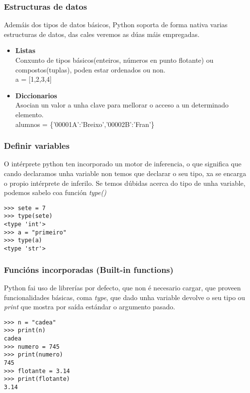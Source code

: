 \begin{frame}
  \frametitle{Estructuras de datos}
  Ademáis dos tipos de datos básicos, Python soporta de forma nativa varias
  estructuras de datos, das cales veremos as dúas máis empregadas.
  \begin{itemize}
  \item \textbf{Listas}\\
    Conxunto de tipos básicos(enteiros, números en punto flotante) ou
    compostos(tuplas), poden estar ordenados ou non.\\
    a = [1,2,3,4]
  \item \textbf{Diccionarios}\\
    Asocian un valor a unha clave para mellorar o acceso a un determinado
    elemento.\\
    alumnos = \{'00001A':'Breixo','00002B':'Fran'\}
  \end{itemize}
\end{frame}

\begin{frame}[fragile]
  \frametitle{Definir variables}
  O intérprete python ten incorporado un motor de inferencia, o que significa
  que cando declaramos unha variable non temos que declarar o seu tipo, xa se
  encarga o propio intérprete de inferilo. Se temos dúbidas acerca do tipo de unha
  variable, podemos sabelo coa función \emph{type()}
  \small
\begin{verbatim}
>>> sete = 7
>>> type(sete)
<type 'int'>
>>> a = "primeiro"
>>> type(a)
<type 'str'>
\end{verbatim}
  \normalsize  
\end{frame}

\begin{frame}[fragile]
  \frametitle{Funcións incorporadas (Built-in functions)}
  Python fai uso de librerías por defecto, que non é necesario cargar, que
  proveen funcionalidades básicas, coma \emph{type}, que dado unha variable
  devolve o seu tipo ou \emph{print} que mostra por saída estándar o argumento
  pasado. 
  \small
\begin{verbatim}
>>> n = "cadea"
>>> print(n)
cadea
>>> numero = 745
>>> print(numero)
745
>>> flotante = 3.14
>>> print(flotante)
3.14
\end{verbatim}
  \normalsize   
\end{frame}

